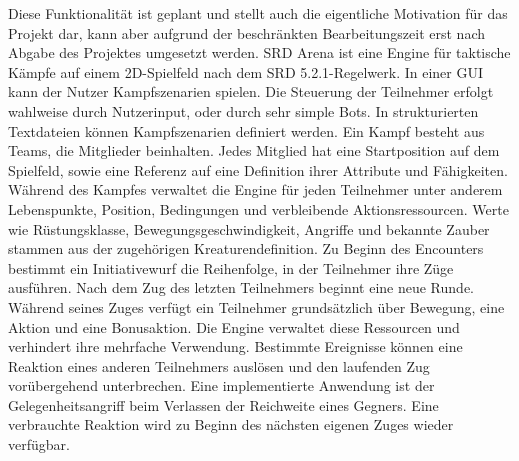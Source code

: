{}Diese Funktionalität ist geplant und stellt auch die eigentliche Motivation für das Projekt dar, kann aber aufgrund der beschränkten Bearbeitungszeit erst nach Abgabe des Projektes umgesetzt werden.\markdownRendererParagraphSeparator
{}\markdownRendererParagraphSeparator
{}
\markdownRendererSectionEnd \markdownRendererSectionBegin
{}\markdownRendererInterblockSeparator
{}SRD Arena ist eine Engine für taktische Kämpfe auf einem 2D-Spielfeld nach dem SRD 5.2.1-Regelwerk. In einer GUI kann der Nutzer Kampfszenarien spielen. Die Steuerung der Teilnehmer erfolgt wahlweise durch Nutzerinput, oder durch sehr simple Bots.\markdownRendererSoftLineBreak
{}In strukturierten Textdateien können Kampfszenarien definiert werden. Ein Kampf besteht aus Teams, die Mitglieder beinhalten. Jedes Mitglied hat eine Startposition auf dem Spielfeld, sowie eine Referenz auf eine Definition ihrer Attribute und Fähigkeiten.\markdownRendererInterblockSeparator
{}\markdownRendererSectionBegin
{}\markdownRendererInterblockSeparator
{}Während des Kampfes verwaltet die Engine für jeden Teilnehmer unter anderem Lebenspunkte, Position, Bedingungen und verbleibende Aktionsressourcen. Werte wie Rüstungsklasse, Bewegungsgeschwindigkeit, Angriffe und bekannte Zauber stammen aus der zugehörigen Kreaturendefinition.\markdownRendererInterblockSeparator
{}
\markdownRendererSectionEnd \markdownRendererSectionBegin
{}\markdownRendererInterblockSeparator
{}Zu Beginn des Encounters bestimmt ein Initiativewurf die Reihenfolge, in der Teilnehmer ihre Züge ausführen. Nach dem Zug des letzten Teilnehmers beginnt eine neue Runde.\markdownRendererSoftLineBreak
{}Während seines Zuges verfügt ein Teilnehmer grundsätzlich über Bewegung, eine Aktion und eine Bonusaktion. Die Engine verwaltet diese Ressourcen und verhindert ihre mehrfache Verwendung.\markdownRendererSoftLineBreak
{}Bestimmte Ereignisse können eine Reaktion eines anderen Teilnehmers auslösen und den laufenden Zug vorübergehend unterbrechen. Eine implementierte Anwendung ist der Gelegenheitsangriff beim Verlassen der Reichweite eines Gegners. Eine verbrauchte Reaktion wird zu Beginn des nächsten eigenen Zuges wieder verfügbar.\markdownRendererInterblockSeparator
